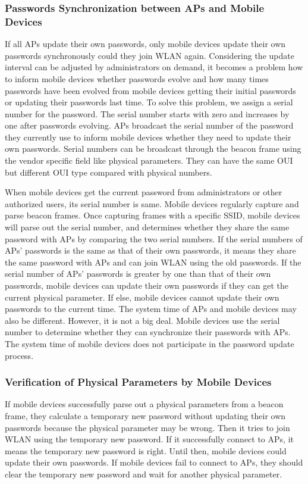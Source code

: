 \subsubsection{Passwords Synchronization between APs and Mobile Devices}
If all APs update their own passwords, only mobile devices update their own passwords synchronously could they join WLAN again. Considering the update interval can be adjusted by administrators on demand, it becomes a problem how to inform mobile devices whether passwords evolve and how many times passwords have been evolved from mobile devices getting their initial passwords or updating their passwords last time. To solve this problem, we assign a serial number for the password. The serial number starts with zero and increases by one after passwords evolving. APs broadcast the serial number of the password they currently use to inform mobile devices whether they need to update their own passwords. Serial numbers can be broadcast through the beacon frame using the vendor specific field like physical parameters. They can have the same OUI but different OUI type compared with physical numbers. 


When mobile devices get the current password from administrators or other authorized users, its serial number is same. Mobile devices regularly capture and parse beacon frames. Once capturing frames with a specific SSID, mobile devices will parse out the serial number, and determines whether they share the same password with APs by comparing the two serial numbers. If the serial numbers of APs’ passwords is the same as that of their own passwords, it means they share the same password with APs and can join WLAN using the old passwords. If the serial number of APs’ passwords is greater by one than that of their own passwords, mobile devices can update their own passwords if they can get the current physical parameter. If else, mobile devices cannot update their own passwords to the current time. The system time of APs and mobile devices may also be different. However, it is not a big deal. Mobile devices use the serial number to determine whether they can synchronize their passwords with APs. The system time of mobile devices does not participate in the password update process. 


\subsubsection{Verification of Physical Parameters by Mobile Devices}
If mobile devices successfully parse out a physical parameters from a beacon frame, they calculate a temporary new password without updating their own passwords because the physical parameter may be wrong. Then it tries to join WLAN using the temporary new password. If it successfully connect to APs, it means the temporary new password is right. Until then, mobile devices could update their own passwords. If mobile devices fail to connect to APs, they should clear the temporary new password and wait for another physical parameter. 


